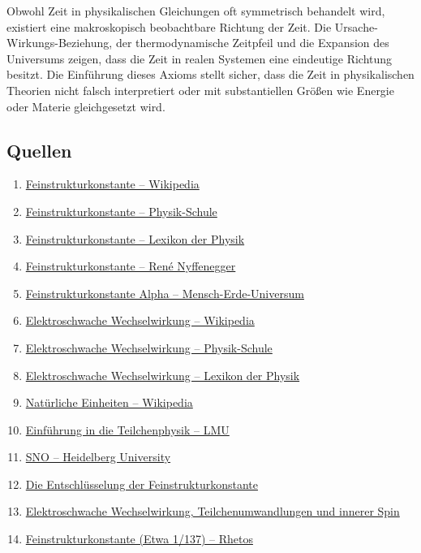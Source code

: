 \documentclass{article}
\begin{document}
Obwohl Zeit in physikalischen Gleichungen oft symmetrisch behandelt wird, existiert eine makroskopisch beobachtbare Richtung der Zeit. Die Ursache-Wirkungs-Beziehung, der thermodynamische Zeitpfeil und die Expansion des Universums zeigen, dass die Zeit in realen Systemen eine eindeutige Richtung besitzt. Die Einführung dieses Axioms stellt sicher, dass die Zeit in physikalischen Theorien nicht falsch interpretiert oder mit substantiellen Größen wie Energie oder Materie gleichgesetzt wird.
	
	\subsection{Quellen}
	\begin{enumerate}
		\item \href{https://de.wikipedia.org/wiki/Feinstrukturkonstante}{Feinstrukturkonstante – Wikipedia}
		\item \href{https://www.cosmos-indirekt.de/Physik-Schule/Feinstrukturkonstante}{Feinstrukturkonstante – Physik-Schule}
		\item \href{https://www.spektrum.de/lexikon/physik/feinstrukturkonstante/4829}{Feinstrukturkonstante – Lexikon der Physik}
		\item \href{https://renenyffenegger.ch/notes/Wissenschaft/Physik/Konstanten/Feinstrukturkonstante}{Feinstrukturkonstante – René Nyffenegger}
		\item \href{https://mensch-erde-universum.de/feinstrukturkonstante/}{Feinstrukturkonstante Alpha – Mensch-Erde-Universum}
		\item \href{https://de.wikipedia.org/wiki/Elektroschwache_Wechselwirkung}{Elektroschwache Wechselwirkung – Wikipedia}
		\item \href{https://www.cosmos-indirekt.de/Physik-Schule/Elektroschwache_Wechselwirkung}{Elektroschwache Wechselwirkung – Physik-Schule}
		\item \href{https://www.spektrum.de/lexikon/physik/elektroschwache-wechselwirkung/4197}{Elektroschwache Wechselwirkung – Lexikon der Physik}
		\item \href{https://de.wikipedia.org/wiki/Nat%C3%BCrliche_Einheiten}{Natürliche Einheiten – Wikipedia}
		\item \href{https://www-static.etp.physik.uni-muenchen.de/fp-versuch/node5.html}{Einführung in die Teilchenphysik – LMU}
		\item \href{https://www.thphys.uni-heidelberg.de/~wolschin/alpha.html}{SNO – Heidelberg University}
		\item \href{https://vixra.org/pdf/1408.0018vM.pdf}{Die Entschlüsselung der Feinstrukturkonstante}
		\item \href{https://nsosp.org/de/Quanten-Fluss-Theorie/Elektroschwache-Wechselwirkung-Teilchenumwandlungen-schwacher-Isospin_de.php}{Elektroschwache Wechselwirkung, Teilchenumwandlungen und innerer Spin}
		\item \href{https://www.rhetos.de/html/lex/feinstrukturkonstante.htm}{Feinstrukturkonstante (Etwa 1/137) – Rhetos}
	\end{enumerate}
\end{document}
